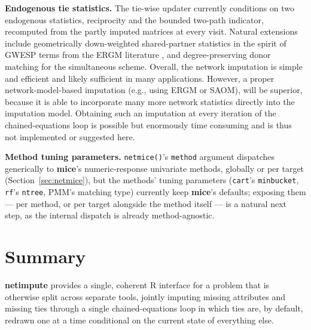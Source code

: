 \documentclass[11pt,a4paper]{article}
\newcommand{\pkg}[1]{\textbf{#1}}
\newcommand{\code}[1]{\texttt{#1}}
\newcommand{\proglang}[1]{\textsf{#1}}
\begin{document}
\textbf{Endogenous tie statistics.} The tie-wise updater currently
conditions on two endogenous statistics, reciprocity and the bounded
two-path indicator, recomputed from the partly imputed matrices at every
visit. Natural extensions include geometrically down-weighted shared-partner statistics in the spirit
of GWESP terms from the ERGM literature \citep{Robins2007}, and
degree-preserving donor matching for the simultaneous scheme. Overall, the
network imputation is simple and efficient and likely sufficient in many
applications. However, a proper network-model-based imputation (e.g., using ERGM
or SAOM), will be superior, because it is able to incorporate many more network
statistics directly into the imputation model. Obtaining such an imputation at
every iteration of the chained-equations loop is possible but enormously time
consuming and is thus not implemented or suggested here.

\textbf{Method tuning parameters.} \code{netmice()}'s \code{method}
argument dispatches generically to \pkg{mice}'s numeric-response
univariate methods, globally or per target
(Section~\ref{sec:netmice}), but the methods' tuning parameters
(\code{cart}'s \code{minbucket}, \code{rf}'s \code{ntree}, PMM's matching
type) currently keep \pkg{mice}'s defaults; exposing them --- per method,
or per target alongside the method itself --- is a natural next step, as
the internal dispatch is already method-agnostic.

\section{Summary}
\label{sec:summary}

\pkg{netimpute} provides a single, coherent \proglang{R} interface for a
problem that is otherwise split across separate tools, jointly imputing missing
attributes and missing ties through a single chained-equations loop in
which ties are, by default, redrawn one at a time conditional on the
current state of everything else.



\end{document}

